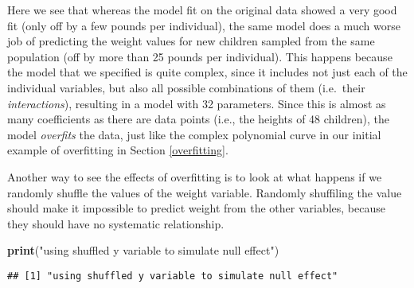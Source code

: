 \documentclass[]{book}
\newenvironment{Shaded}{\begin{snugshade}}{\end{snugshade}}
\newcommand{\KeywordTok}[1]{\textcolor[rgb]{0.13,0.29,0.53}{\textbf{#1}}}
\newcommand{\DataTypeTok}[1]{\textcolor[rgb]{0.13,0.29,0.53}{#1}}
\newcommand{\DecValTok}[1]{\textcolor[rgb]{0.00,0.00,0.81}{#1}}
\newcommand{\StringTok}[1]{\textcolor[rgb]{0.31,0.60,0.02}{#1}}
\newcommand{\OtherTok}[1]{\textcolor[rgb]{0.56,0.35,0.01}{#1}}
\newcommand{\OperatorTok}[1]{\textcolor[rgb]{0.81,0.36,0.00}{\textbf{#1}}}
\newcommand{\NormalTok}[1]{#1}
\theoremstyle{definition}
\theoremstyle{definition}
\theoremstyle{definition}
\theoremstyle{remark}
\begin{document}
Here we see that whereas the model fit on the original data showed a
very good fit (only off by a few pounds per individual), the same model
does a much worse job of predicting the weight values for new children
sampled from the same population (off by more than 25 pounds per
individual). This happens because the model that we specified is quite
complex, since it includes not just each of the individual variables,
but also all possible combinations of them (i.e.~their
\emph{interactions}), resulting in a model with 32 parameters. Since
this is almost as many coefficients as there are data points (i.e., the
heights of 48 children), the model \emph{overfits} the data, just like
the complex polynomial curve in our initial example of overfitting in
Section \ref{overfitting}.

Another way to see the effects of overfitting is to look at what happens
if we randomly shuffle the values of the weight variable. Randomly
shuffiling the value should make it impossible to predict weight from
the other variables, because they should have no systematic
relationship.

\begin{Shaded}
\begin{Highlighting}[]
\KeywordTok{print}\NormalTok{(}\StringTok{"using shuffled y variable to simulate null effect"}\NormalTok{)}
\end{Highlighting}
\end{Shaded}

\begin{verbatim}
## [1] "using shuffled y variable to simulate null effect"
\end{verbatim}

\begin{Shaded}
\end{Shaded}
\end{document}
